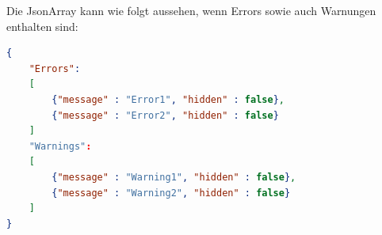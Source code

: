 Die JsonArray kann wie folgt aussehen, wenn Errors sowie auch Warnungen enthalten sind:

\begin{lstlisting}[language=json,firstnumber=1, caption=Json-Objekt mit Errors und Warnungen]
{ 
	"Errors": 
	[ 
		{"message" : "Error1", "hidden" : false}, 
		{"message" : "Error2", "hidden" : false} 
	] 
	"Warnings": 
	[ 
		{"message" : "Warning1", "hidden" : false}, 
		{"message" : "Warning2", "hidden" : false} 
	] 
} 
\end{lstlisting}

\newpage

